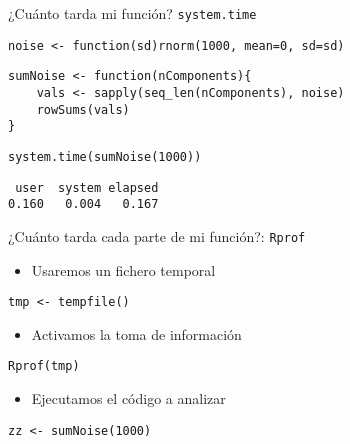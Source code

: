 \documentclass[xcolor={usenames,svgnames,dvipsnames}]{beamer}
\begin{document}
\begin{frame}[fragile,label={sec:orgheadline24}]{¿Cuánto tarda mi función? \texttt{system.time}}
 \lstset{language=R,label= ,caption= ,captionpos=b,numbers=none}
\begin{lstlisting}
noise <- function(sd)rnorm(1000, mean=0, sd=sd)
\end{lstlisting}

\lstset{language=R,label= ,caption= ,captionpos=b,numbers=none}
\begin{lstlisting}
sumNoise <- function(nComponents){
    vals <- sapply(seq_len(nComponents), noise)
    rowSums(vals)
}
\end{lstlisting}

\lstset{language=R,label= ,caption= ,captionpos=b,numbers=none}
\begin{lstlisting}
system.time(sumNoise(1000))
\end{lstlisting}

\begin{verbatim}
 user  system elapsed 
0.160   0.004   0.167
\end{verbatim}
\end{frame}

\begin{frame}[fragile,label={sec:orgheadline25}]{¿Cuánto tarda cada parte de mi función?: \texttt{Rprof}}
 \begin{itemize}
\item Usaremos un fichero temporal
\end{itemize}
\lstset{language=R,label= ,caption= ,captionpos=b,numbers=none}
\begin{lstlisting}
tmp <- tempfile()
\end{lstlisting}

\begin{itemize}
\item Activamos la toma de información
\end{itemize}
\lstset{language=R,label= ,caption= ,captionpos=b,numbers=none}
\begin{lstlisting}
Rprof(tmp)
\end{lstlisting}

\begin{itemize}
\item Ejecutamos el código a analizar
\end{itemize}
\lstset{language=R,label= ,caption= ,captionpos=b,numbers=none}
\begin{lstlisting}
zz <- sumNoise(1000)
\end{lstlisting}
\end{frame}
\end{document}
